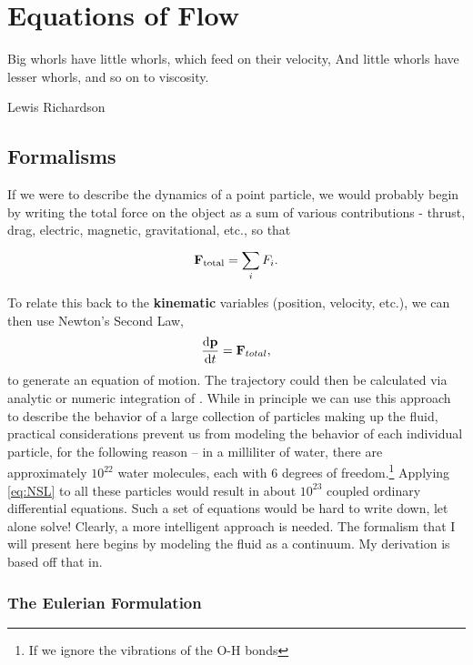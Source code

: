 \setcounter{secnumdepth}{3}
\chapter{Equations of Flow}
    	 	\epigraph{Big whorls have little whorls, which feed on their velocity, And little whorls have lesser whorls, and so on to viscosity.}{Lewis Richardson}
\section{Formalisms}
If we were to describe the dynamics of a point particle, we would probably begin by writing the total force on the object as a sum of various contributions - thrust, drag, electric, magnetic, gravitational, etc., so that 
\begin{equation}
\Vector{F}_{\mathrm{total}} = \sum{i}{}{F_{i}}.
\end{equation}

To relate this back to the {\bf kinematic} variables (position, velocity, etc.), we can then use Newton's Second Law,
\begin{equation}\label{eq:NSL}
\der{1}{\Vector{p}}{t} = \Vector{F}_{total},
\end{equation}
to generate an equation of motion. The trajectory could then be calculated via analytic or numeric integration of . While in principle we can use this approach to describe the behavior of a large collection of particles making up the fluid, practical considerations prevent us from modeling the behavior of each individual particle, for the following reason -- in a milliliter of water, there are approximately $10^{22}$ water molecules, each with 6 degrees of freedom.\footnote{If we ignore the vibrations of the O-H bonds} Applying \eqref{eq:NSL} to all these particles would result in about $10^{23}$ coupled ordinary differential equations. Such a set of equations would be hard to write down, let alone solve! Clearly, a more intelligent approach is needed. The formalism that I will present here begins by modeling the fluid as a continuum. My derivation is based off that in. \\

\subsection{The Eulerian Formulation}

